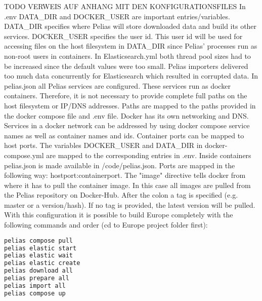TODO VERWEIS AUF ANHANG MIT DEN KONFIGURATIONSFILES
In .env DATA{\_}DIR and DOCKER{\_}USER are important entries/variables. DATA{\_}DIR specifies where Pelias will store downloaded data and build its other services. DOCKER{\_}USER specifies the user id. This user id will be used for accessing files on the host filesystem in DATA{\_}DIR since Pelias' processes run as non-root users in containers.
In Elasticsearch.yml both thread pool sizes had to be increased since the default values were too small. Pelias importers delivered too much data concurrently for Elasticsearch which resulted in corrupted data.
In pelias.json all Pelias services are configured. These services run as docker containers. Therefore, it is not necessary to provide complete full paths on the host filesystem or IP/DNS addresses. Paths are mapped to the paths provided in the docker compose file  and .env file. Docker has its own networking and DNS. Services in a docker network can be addressed by using docker compose service names as well as container names and ids. Container ports can be mapped to host ports.
The variables DOCKER{\_}USER and DATA{\_}DIR in docker-compose.yml are mapped to the corresponding entries in .env. Inside containers pelias.json is made available in /code/pelias.json. Ports are mapped in the following way:
hostport:containerport.
The "image" directive tells docker from where it has to pull the container image. In this case all images are pulled from the Pelias repository on Docker-Hub. After the colon a tag is specified (e.g. master or a version/hash). If no tag is provided, the latest version will be pulled.
With this configuration it is possible to build Europe completely with the following commands and order (cd to Europe project folder first):
\begin{lstlisting}[language=bash,breaklines=true]
pelias compose pull
pelias elastic start
pelias elastic wait
pelias elastic create
pelias download all
pelias prepare all
pelias import all
pelias compose up
\end{lstlisting}